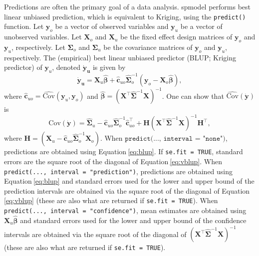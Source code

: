 \documentclass{article}
\begin{document}
Predictions are often the primary goal of a data analysis. spmodel
performs best linear unbiased prediction, which is equivalent to
Kriging, using the \texttt{predict()} function. Let \(\mathbf{y}_o\) be
a vector of observed variables and \(\mathbf{y}_u\) be a vector of
unobserved variables. Let \(\mathbf{X}_o\) and \(\mathbf{X}_u\) be the
fixed effect design matrices of \(\mathbf{y}_o\) and \(\mathbf{y}_u\),
respectively. Let \(\mathbf{\Sigma}_o\) and \(\mathbf{\Sigma}_u\) be the
covariance matrices of \(\mathbf{y}_o\) and \(\mathbf{y}_u\),
respectively. The (empirical) best linear unbiased predictor (BLUP;
Kriging predictor) of \(\mathbf{y}_u\), denoted \(\mathbf{\dot{y}_u}\)
is given by \begin{equation}\label{eq:blup}
  \mathbf{\dot{y}_u} =  \mathbf{X}_u \bm{\hat{\beta}} + \mathbf{\hat{c}}_{uo} \mathbf{\hat{\Sigma}}^{-1}_o (\mathbf{y}_o - \mathbf{X}_o \bm{\hat{\beta}}) ,
\end{equation} where
\(\mathbf{\hat{c}}_{uo} = \hat{\text{Cov}}(\mathbf{y}_u, \mathbf{y}_o)\)
and
\(\bm{\hat{\beta}} = (\mathbf{X}^\intercal \mathbf{\hat{\Sigma}}^{-1} \mathbf{X})^{-1}\).
One can show that \(\hat{\text{Cov}}(\mathbf{\dot{y}})\) is
\begin{equation}\label{eq:vblup}
  \text{Cov}(\mathbf{\dot{y}}) = \mathbf{\hat{\Sigma}}_u - \mathbf{\hat{c}}_{uo} \mathbf{\hat{\Sigma}}^{-1}_o \mathbf{\hat{c}}_{uo}^\intercal + \mathbf{H}(\mathbf{X}^\intercal \mathbf{\hat{\Sigma}}^{-1} \mathbf{X})^{-1}\mathbf{H}^\intercal ,
\end{equation} where
\(\mathbf{H} = (\mathbf{X}_u - \mathbf{\hat{c}}_{uo} \mathbf{\hat{\Sigma}}^{-1}_o \mathbf{X}_o)\).
When \(\texttt{predict(..., interval = "none")}\), predictions are
obtained using Equation\(~\)\ref{eq:blup}. If \texttt{se.fit = TRUE},
standard errors are the square root of the diagonal of
Equation\(~\)\ref{eq:vblup}. When
\texttt{predict(..., interval = "prediction")}, predictions are obtained
using Equation\(~\)\ref{eq:blup} and standard errors used for the lower
and upper bound of the prediction intervals are obtained via the square
root of the diagonal of Equation\(~\)\ref{eq:vblup} (these are also what
are returned if \texttt{se.fit = TRUE}). When
\texttt{predict(..., interval = "confidence")}, mean estimates are
obtained using \(\mathbf{X}_u \bm{\hat{\beta}}\) and standard errors
used for the lower and upper bound of the confidence intervals are
obtained via the square root of the diagonal of
\((\mathbf{X}^\intercal \mathbf{\hat{\Sigma}}^{-1} \mathbf{X})^{-1}\)
(these are also what are returned if \texttt{se.fit = TRUE}).
\end{document}
